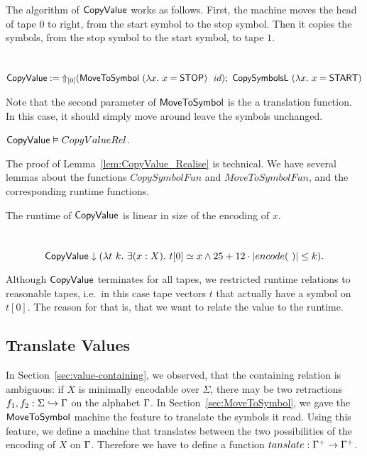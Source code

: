 The algorithm of $\MS{CopyValue}$ works as follows.  First, the machine moves the head of tape $0$ to right, from the start symbol to the stop symbol.
Then it copies the symbols, from the stop symbol to the start symbol, to tape $1$.

\begin{definition}[$\MS{CopyValue}$]
  \label{def:CopyValue}
  ~
  \small
  \[
    \MS{CopyValue} := \LiftTapes{(\MS{MoveToSymbol}~(\lambda x.~x=\MS{STOP})~~id)}{\Vector{0}} \Seq \MS{CopySymbolsL}~(\lambda x.~x=\MS{START})
  \]
\end{definition}

Note that the second parameter of $\MS{MoveToSymbol}$ is the a translation function.  In this case, it should simply move around leave the symbols
unchanged.

\begin{lemma}
  \label{lem:CopyValue_Realise}
  $\MS{CopyValue} \Realise CopyValueRel$.
\end{lemma}

The proof of Lemma~\ref{lem:CopyValue_Realise} is technical.  We have several lemmas about the functions $CopySymbolFun$ and $MoveToSymbolFun$, and
the corresponding runtime functions.

The runtime of $\MS{CopyValue}$ is linear in size of the encoding of $x$.
\begin{lemma}
  \label{lem:CopyValue_TerminatesIn}
  ~
  \[
    \MS{CopyValue} \TerminatesIn (\lambda t~k.~\exists(x:X).~t[0] \simeq x \land 25 + 12 \cdot \size{~} \leq k).
  \]
\end{lemma}

Although $\MS{CopyValue}$ terminates for all tapes, we restricted runtime relations to reasonable tapes, i.e.\ in this case tape vectors $t$ that
actually have a symbol on $t[0]$.  The reason for that is, that we want to relate the value to the runtime.

\subsection{Translate Values}
\label{sec:Translate}

In Section~\ref{sec:value-containing}, we observed, that the containing relation is ambiguous: if $X$ is minimally encodable over $\Sigma$, there may
be two retractions $f_1, f_2 : \Sigma \hookrightarrow \Tau$ on the alphabet $\Tau$.  In Section~\ref{sec:MoveToSymbol}, we gave the
$\MS{MoveToSymbol}$ machine the feature to translate the symbols it read.  Using this feature, we define a machine that translates between the two
possibilities of the encoding of $X$ on $\Tau$.  Therefore we have to define a function $tanslate : \Tau^+ \to \Tau^+$.

